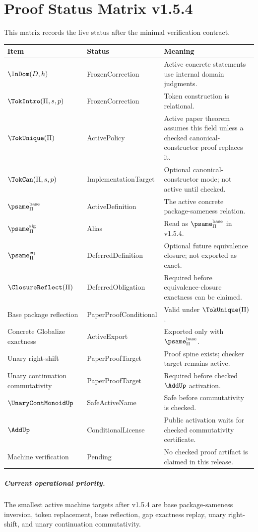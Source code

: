 
\chapter{Proof Status Matrix v1.5.4}
\label{ch:v154-status-matrix}

This matrix records the live status after the minimal verification contract.

\begin{longtable}{p{}p{}p{}}
\toprule
\textbf{Item} & \textbf{Status} & \textbf{Meaning}\\
\midrule
\(\InDom(D,h)\) & FrozenCorrection & Active concrete statements use internal domain judgments.\\
\(\TokIntro(\Pi,s,p)\) & FrozenCorrection & Token construction is relational.\\
\(\TokUnique(\Pi)\) & ActivePolicy & Active paper theorem assumes this field unless a checked canonical-constructor proof replaces it.\\
\(\TokCan(\Pi,s,p)\) & ImplementationTarget & Optional canonical-constructor mode; not active until checked.\\
\(\psame_{\Pi}^{\mathrm{base}}\) & ActiveDefinition & The active concrete package-sameness relation.\\
\(\psame_{\Pi}^{\mathrm{sig}}\) & Alias & Read as \(\psame_{\Pi}^{\mathrm{base}}\) in v1.5.4.\\
\(\psame_{\Pi}^{\mathrm{eq}}\) & DeferredDefinition & Optional future equivalence closure; not exported as exact.\\
\(\ClosureReflect(\Pi)\) & DeferredObligation & Required before equivalence-closure exactness can be claimed.\\
Base package reflection & PaperProofConditional & Valid under \(\TokUnique(\Pi)\).\\
Concrete Globalize exactness & ActiveExport & Exported only with \(\psame_{\Pi}^{\mathrm{base}}\).\\
Unary right-shift & PaperProofTarget & Proof spine exists; checker target remains active.\\
Unary continuation commutativity & PaperProofTarget & Required before checked \(\AddUp\) activation.\\
\(\UnaryContMonoidUp\) & SafeActiveName & Safe before commutativity is checked.\\
\(\AddUp\) & ConditionalLicense & Public activation waits for checked commutativity certificate.\\
Machine verification & Pending & No checked proof artifact is claimed in this release.\\
\bottomrule
\end{longtable}

\paragraph{Current operational priority.}
The smallest active machine targets after v1.5.4 are base package-sameness inversion, token replacement, base reflection, gap exactness replay, unary right-shift, and unary continuation commutativity.
